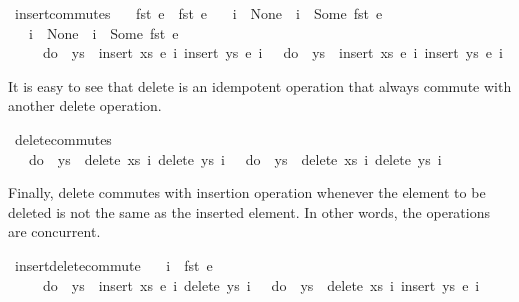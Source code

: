 \documentclass[acmlarge,review,anonymous]{acmart}\settopmatter{printfolios=true}
\begin{document}
\begin{isabellebody}
\isanewline
{}\isamarkupfalse%
\ insert{\isacharunderscore}commutes{\isacharcolon}\isanewline
\ \ \ {\isachardoublequoteopen}fst\ e{}\ {\isasymnoteq}\ fst\ e{}{\isachardoublequoteclose}\isanewline
\ \ \ {\isachardoublequoteopen}i{}\ {\isacharequal}\ None\ {\isasymor}\ i{}\ {\isasymnoteq}\ Some\ {\isacharparenleft}fst\ e{}{\isacharparenright}{\isachardoublequoteclose}\isanewline
\ \ \ {\isachardoublequoteopen}i{}\ {\isacharequal}\ None\ {\isasymor}\ i{}\ {\isasymnoteq}\ Some\ {\isacharparenleft}fst\ e{}{\isacharparenright}{\isachardoublequoteclose}\isanewline
\ \ \ \ \ {\isachardoublequoteopen}do\ {\isacharbraceleft}\ ys\ {\isasymleftarrow}\ insert\ xs\ e{}\ i{}{\isacharsemicolon}\ insert\ ys\ e{}\ i{}\ {\isacharbraceright}\ {\isacharequal}\ do\ {\isacharbraceleft}\ ys\ {\isasymleftarrow}\ insert\ xs\ e{}\ i{}{\isacharsemicolon}\ insert\ ys\ e{}\ i{}\ {\isacharbraceright}{\isachardoublequoteclose}\isanewline
\end{isabellebody}

It is easy to see that delete is an idempotent operation that always commute with another delete operation.

\begin{isabellebody}
\isanewline
{}\isamarkupfalse%
\ delete{\isacharunderscore}commutes{\isacharcolon}\isanewline
\ \ \ {\isachardoublequoteopen}do\ {\isacharbraceleft}\ ys\ {\isasymleftarrow}\ delete\ xs\ i{}{\isacharsemicolon}\ delete\ ys\ i{}\ {\isacharbraceright}\ {\isacharequal}\ do\ {\isacharbraceleft}\ ys\ {\isasymleftarrow}\ delete\ xs\ i{}{\isacharsemicolon}\ delete\ ys\ i{}\ {\isacharbraceright}{\isachardoublequoteclose}\isanewline
\end{isabellebody}

Finally, delete commutes with insertion operation whenever the element to be
deleted is not the same as the inserted element. In other words, the operations
are concurrent.

\begin{isabellebody}
\isanewline
{}\isamarkupfalse%
\ insert{\isacharunderscore}delete{\isacharunderscore}commute{\isacharcolon}\isanewline
\ \ \ {\isachardoublequoteopen}i{}\ {\isasymnoteq}\ fst\ e{\isachardoublequoteclose}\isanewline
\ \ \ \ \ {\isachardoublequoteopen}do\ {\isacharbraceleft}\ ys\ {\isasymleftarrow}\ insert\ xs\ e\ i{}{\isacharsemicolon}\ delete\ ys\ i{}\ {\isacharbraceright}\ {\isacharequal}\ do\ {\isacharbraceleft}\ ys\ {\isasymleftarrow}\ delete\ xs\ i{}{\isacharsemicolon}\ insert\ ys\ e\ i{}\ {\isacharbraceright}{\isachardoublequoteclose}
\end{isabellebody}
\end{document}
